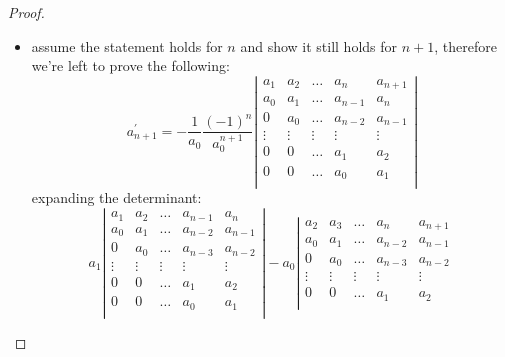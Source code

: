 \begin{proof}
\begin{itemize}
    \item assume the statement holds for $n$ and show it still holds for $n+1$, therefore
        we're left to prove the following:
    \begin{displaymath}                
        a_{n+1}^{\prime} = 
            -\frac{1}{a_{0}}\frac{(-1)^{n}}{a_{0}^{n+1}}
            \left|
            \begin{array}{ccccc}
                a_1 & a_2 & \ldots & a_{n} & a_{n+1}\\
                a_0 & a_1 & \ldots & a_{n-1} & a_{n}\\
                0   & a_0 & \ldots & a_{n-2} & a_{n-1}\\
                \vdots & \vdots & \vdots & \vdots & \vdots\\
                0 & 0 & \ldots & a_{1} & a_{2}\\
                0 & 0 & \ldots & a_{0} & a_{1}\\
            \end{array}
            \right|
    \end{displaymath}                
    expanding the determinant:
    \begin{displaymath}                
        a_{1}
            \left|
            \begin{array}{ccccc}
                a_1 & a_2 & \ldots & a_{n-1} & a_{n}\\
                a_0 & a_1 & \ldots & a_{n-2} & a_{n-1}\\
                0   & a_0 & \ldots & a_{n-3} & a_{n-2}\\
                \vdots & \vdots & \vdots & \vdots & \vdots\\
                0 & 0 & \ldots & a_{1} & a_{2}\\
                0 & 0 & \ldots & a_{0} & a_{1}\\
            \end{array}
            \right|
        - a_{0}
            \left|
            \begin{array}{ccccc}
                a_2 & a_3 & \ldots & a_{n} & a_{n+1}\\
                a_0 & a_1 & \ldots & a_{n-2} & a_{n-1}\\
                0   & a_0 & \ldots & a_{n-3} & a_{n-2}\\
                \vdots & \vdots & \vdots & \vdots & \vdots\\
                0 & 0 & \ldots & a_{1} & a_{2}\\

\end{array}
\end{displaymath}
\end{itemize}
\end{proof}
